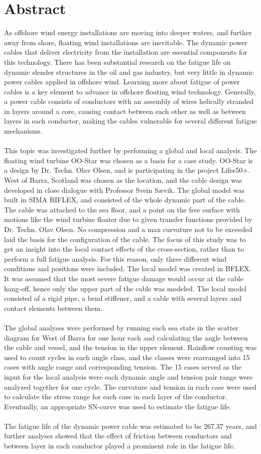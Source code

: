 \chapter*{Abstract}

As offshore wind energy installations are moving into deeper waters, and further away from shore, floating wind installations are inevitable. The dynamic power cables that deliver electricity from the installation are essential components for this technology. There has been substantial research on the fatigue life on dynamic slender structures in the oil and gas industry, but very little in dynamic power cables applied in offshore wind. Learning more about fatigue of power cables is a key element to advance in offshore floating wind technology. Generally, a power cable consists of conductors with an assembly of wires helically stranded in layers around a core, causing contact between each other as well as between layers in each conductor, making the cables vulnerable for several different fatigue mechanisms.\\\\
This topic was investigated further by performing a global and local analysis. The floating wind turbine OO-Star was chosen as a basis for a case study. OO-Star is a design by Dr. Techn. Olav Olsen, and is participating in the project Lifes50+. West of Barra, Scotland was chosen as the location, and the cable design was developed in close dialogue with Professor Svein Sævik. The global model was built in SIMA RIFLEX, and consisted of the whole dynamic part of the cable. The cable was attached to the sea floor, and a point on the free surface with motions like the wind turbine floater due to given transfer functions provided by Dr. Techn. Olav Olsen. No compression and a max curvature not to be exceeded laid the basis for the configuration of the cable. The focus of this study was to get an insight into the local contact effects of the cross-section, rather than to perform a full fatigue analysis. For this reason, only three different wind conditions and positions were included. The local model was created in BFLEX. It was assumed that the most severe fatigue damage would occur at the cable hang-off, hence only the upper part of the cable was modeled. The local model consisted of a rigid pipe, a bend stiffener, and a cable with several layers and contact elements between them.\\\\ The global analyses were performed by running each sea state in the scatter diagram for West of Barra for one hour each and calculating the angle between the cable and vessel, and the tension in the upper element. Rainflow counting was used to count cycles in each angle class, and the classes were rearranged into 15 cases with angle range and corresponding tension. The 15 cases served as the input for the local analysis were each dynamic angle and tension pair range were analyzed together for one cycle. The curvature and tension in each case were used to calculate the stress range for each case in each layer of the conductor. Eventually, an appropriate SN-curve was used to estimate the fatigue life.  \\\\
The fatigue life of the dynamic power cable was estimated to be 267.37 years, and further analyses showed that the effect of friction between conductors and between layer in each conductor played a prominent role in the fatigue life.  